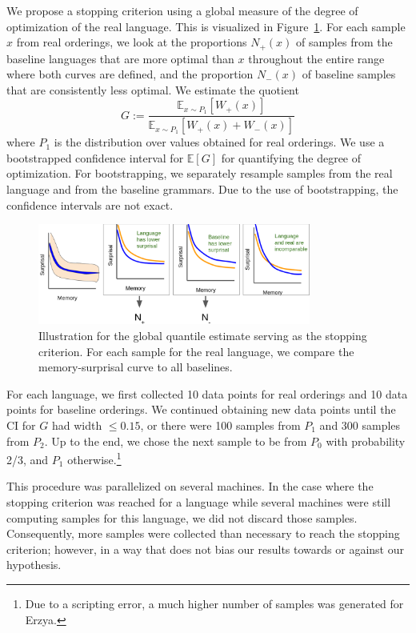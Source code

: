\documentclass[11pt,letterpaper]{article}
\newcommand{\E}[0]{\mathbb{E}}
\begin{document}
We propose a stopping criterion using a global measure of the degree of optimization of the real language.
This is visualized in Figure~\ref{fig:quantile-global}.
For each sample $x$ from real orderings, we look at the proportions $N_+(x)$ of samples from the baseline languages that are more optimal than $x$ throughout the entire range where both curves are defined, and the proportion $N_-(x)$ of baseline samples that are consistently less optimal.
We estimate the quotient
\begin{equation}\label{eq:g}
	G :=	\frac{\E_{x \sim P_1}[W_+(x)]}{\E_{x \sim P_1}[W_+(x) + W_-(x)]}
\end{equation}
where $P_1$ is the distribution over values obtained for real orderings.
We use a bootstrapped confidence interval for $\E[G]$ for quantifying the degree of optimization.
For bootstrapping, we separately resample samples from the real language and from the baseline grammars.
Due to the use of bootstrapping, the confidence intervals are not exact.

\begin{figure}
	\begin{center}
\includegraphics[width=0.8\textwidth]{figures/quantile-global.png}
\end{center}
	\caption{Illustration for the global quantile estimate serving as the stopping criterion. For each sample for the real language, we compare the memory-surprisal curve to all baselines.}\label{fig:quantile-global}
\end{figure}


For each language, we first collected 10 data points for real orderings and 10 data points for baseline orderings.
We continued obtaining new data points until the CI for $G$ had width $\leq 0.15$, or there were 100 samples from $P_1$ and 300 samples from $P_2$.
Up to the end, we chose the next sample to be from $P_0$ with probability 2/3, and $P_1$ otherwise.\footnote{Due to a scripting error, a much higher number of samples was generated for Erzya.}

This procedure was parallelized on several machines.
In the case where the stopping criterion was reached for a language while several machines were still computing samples for this language, we did not discard those samples.
Consequently, more samples were collected than necessary to reach the stopping criterion; however, in a way that does not bias our results towards or against our hypothesis.
\end{document}

